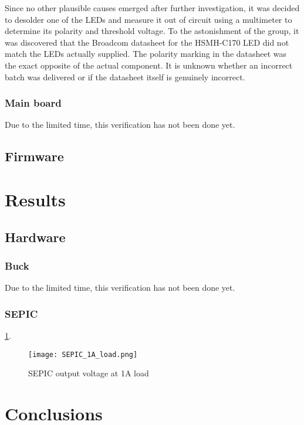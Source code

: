Since no other plausible causes emerged after further investigation, it was decided to desolder one of the LEDs and measure it out of circuit using a multimeter to determine its polarity and threshold voltage. To the astonishment of the group, it was discovered that the Broadcom datasheet for the HSMH-C170 LED did not match the LEDs actually supplied. The polarity marking in the datasheet was the exact opposite of the actual component. It is unknown whether an incorrect batch was delivered or if the datasheet itself is genuinely incorrect.

\subsubsection{Main board}
Due to the limited time, this verification has not been done yet.

\subsection{Firmware}

\section{Results}

\subsection{Hardware}

\subsubsection{Buck}
Due to the limited time, this verification has not been done yet.

\subsubsection{SEPIC}

\ref{fig:Verification_SEPIC_1A_Load}.


\begin{figure}[ht]
    \texttt{[image: SEPIC\_1A\_load.png]}
    \caption{SEPIC output voltage at 1A load}
    \label{fig:Verification_SEPIC_1A_Load}
\end{figure}

\section{Conclusions}

